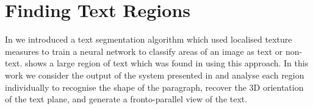 \section{Finding Text Regions}
\label{recoveryusinglines}


In \cite{clarkBMVC2000} we introduced a text segmentation algorithm which used
localised texture measures to train a neural network to classify areas of an
image as text or non-text.  shows a large region of text 
which was found in  using this approach.
In this work we consider the output of the system presented in
\cite{clarkBMVC2000} and analyse each region individually to recognise the shape
of the paragraph, recover the 3D orientation of the text plane, and generate a
fronto-parallel view of the text.




